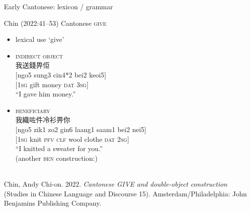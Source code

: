 \documentclass{beamer}
\begin{document}
\begin{frame}[fragile]{Early Cantonese: lexicon / grammar}

Chin (2022:41–53) Cantonese \textsc{give}\\
\begin{itemize}
    \item lexical use \enquote*{give}
    \item \textsc{indirect object}\\
    {\footnotesize 我送錢畀佢\\
    {[ngo5 sung3 cin4*2 bei2 keoi5]}\\
    {[\textsc{1sg} gift money \textsc{dat} \textsc{3sg}]}\\
    \enquote{I gave him money.} }\\
    \item \textsc{beneficiary}\\
    {\footnotesize 我織咗件冷衫畀你\\
    {[ngo5 zik1 zo2 gin6 laang1 saam1 bei2 nei5]}\\
    {[\textsc{1sg} knit \textsc{pfv} \textsc{clf} wool clothe \textsc{dat} \textsc{2sg}]}\\
    \enquote{I knitted a sweater for you.}}\\
    \quad (another \textsc{ben} construction:)\\
    \\
\end{itemize}    

\vfill {} {\tiny 
  Chin, Andy Chi-on. 2022. \textit{Cantonese GIVE and double-object construction} (Studies in Chinese Language and Discourse 15). Amsterdam/Philadelphia: John Benjamins Publishing Company.\par} 

\end{frame}
\end{document}
